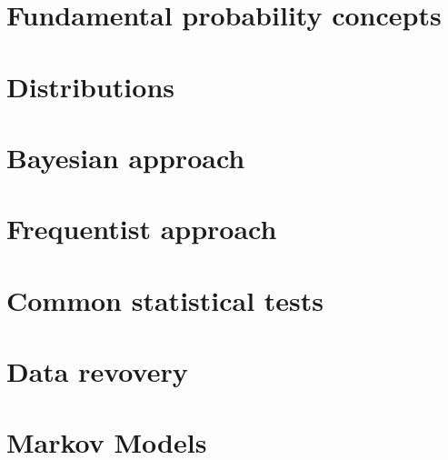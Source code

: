 \chapter{Fundamental probability concepts}


\chapter{Distributions}


\chapter{Bayesian approach}


\chapter{Frequentist approach}


\chapter{Common statistical tests}


\chapter{Data revovery}


\chapter{Markov Models}
